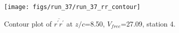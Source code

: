 \begin{figure}[H]
\centering
\texttt{[image: figs/run\_37/run\_37\_rr\_contour]}
\caption{Contour plot of $\overline{r^\prime r^\prime}$ at $z/c$=8.50, $V_{free}$=27.09, station 4.}
\label{fig:run_37_rr_contour}
\end{figure}


